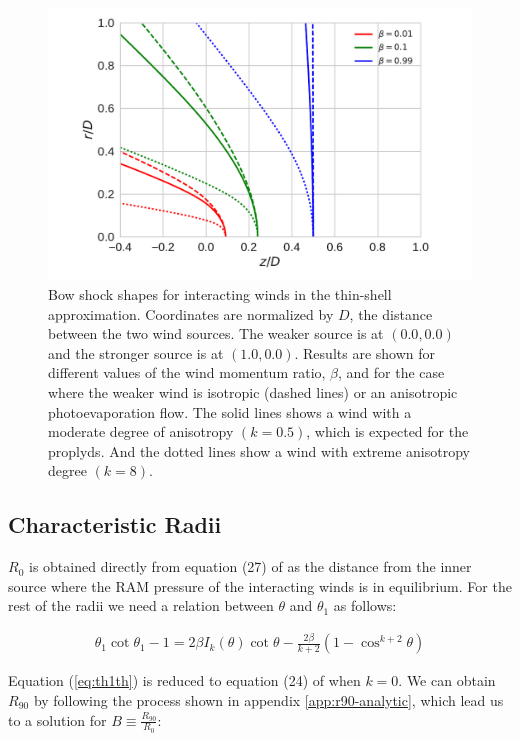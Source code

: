 \begin{figure}
\includegraphics[width=\linewidth]{figs/r-beta}
\caption{Bow shock shapes for interacting winds in the thin-shell
  approximation. Coordinates are normalized by $D$, the distance
  between the two wind sources.  The weaker source is at \((0.0, 0.0)\)
  and the stronger source is at \((1.0, 0.0)\).  Results are shown for
  different values of the wind momentum ratio, \(\beta\), and for the
  case where the weaker wind is isotropic (dashed lines) or an
  anisotropic photoevaporation flow. The solid lines shows a wind with a
  moderate degree of anisotropy $(k=0.5)$, which is expected for the proplyds.
  And the dotted lines show a wind with extreme anisotropy degree $(k=8)$.}
\label{fig:r-beta}
\end{figure}


\subsection{Characteristic Radii}
$R_0$ is obtained directly from equation (27) of \CRW{} as the distance from the inner source where the RAM pressure of the interacting winds is in equilibrium.
For the rest of the radii we need a relation between $\theta$ and $\theta_1$ as follows:


\begin{align}
\theta_1\cot\theta_1 -1 = 2\beta I_k(\theta) \cot\theta - \frac{2\beta}{k+2}\left(1-\cos^{k+2}\theta\right)
\label{eq:th1th}
\end{align}

Equation (\ref{eq:th1th}) is reduced to equation (24) of \CRW{} when $k=0$.
We can obtain $R_{90}$ by following the process shown in appendix \ref{app:r90-analytic},
which lead us to a solution for $B \equiv \frac{R_{90}}{R_0}$:

